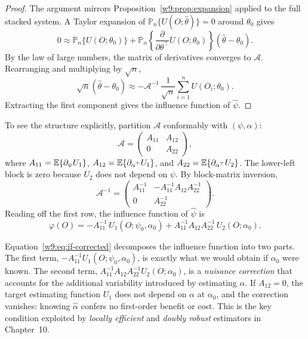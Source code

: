 \documentclass[master.tex]{subfiles}
\begin{document}
\begin{proof}
The argument mirrors Proposition~\ref{w9:prop:expansion} applied to the
full stacked system.  A Taylor expansion of
$\mathbb{P}_n\{U(O;\hat\theta)\}=0$ around $\theta_0$ gives
\[
  0
  \approx
  \mathbb{P}_n\{U(O;\theta_0)\}
  +
  \mathbb{P}_n\!\left\{\frac{\partial}{\partial\theta^\top}
  U(O;\theta_0)\right\}(\hat\theta-\theta_0).
\]
By the law of large numbers, the matrix of derivatives converges to
$\mathcal{A}$.  Rearranging and multiplying by $\sqrt{n}$,
\[
  \sqrt{n}(\hat\theta - \theta_0)
  \approx
  -\mathcal{A}^{-1}\,\frac{1}{\sqrt{n}}\sum_{i=1}^n U(O_i;\theta_0).
\]
Extracting the first component gives the influence function of
$\hat\psi$.
\end{proof}

To see the structure explicitly, partition $\mathcal{A}$ conformably
with $(\psi,\alpha)$:
\[
  \mathcal{A}
  =
  \begin{pmatrix} A_{11} & A_{12} \\ 0 & A_{22} \end{pmatrix},
\]
where $A_{11} = \mathbb{E}\{\partial_\psi U_1\}$,
$A_{12} = \mathbb{E}\{\partial_{\alpha^\top} U_1\}$, and
$A_{22} = \mathbb{E}\{\partial_{\alpha^\top} U_2\}$.
The lower-left block is zero because $U_2$ does not depend on $\psi$.
By block-matrix inversion,
\[
  \mathcal{A}^{-1}
  =
  \begin{pmatrix}
    A_{11}^{-1} & -A_{11}^{-1}A_{12}A_{22}^{-1} \\
    0 & A_{22}^{-1}
  \end{pmatrix}.
\]
Reading off the first row, the influence function of $\hat\psi$ is
\begin{equation}
  \varphi(O)
  =
  -A_{11}^{-1}\,U_1(O;\psi_0,\alpha_0)
  +A_{11}^{-1}A_{12}A_{22}^{-1}\,U_2(O;\alpha_0).
  \label{w9:eq:if-corrected}
\end{equation}

\begin{remark}
\label{w9:rem:correction}
Equation~\eqref{w9:eq:if-corrected} decomposes the influence function
into two parts.  The first term,
$-A_{11}^{-1}U_1(O;\psi_0,\alpha_0)$, is exactly what we would obtain
if $\alpha_0$ were known.  The second term,
$A_{11}^{-1}A_{12}A_{22}^{-1}U_2(O;\alpha_0)$, is a
\emph{nuisance correction} that accounts for the additional variability
introduced by estimating $\alpha$.  If $A_{12}=0$, the target estimating
function $U_1$ does not depend on $\alpha$ at $\alpha_0$, and the
correction vanishes: knowing $\hat\alpha$ confers no first-order
benefit or cost.  This is the key condition exploited by
\emph{locally efficient} and \emph{doubly robust} estimators in
Chapter~10.
\end{remark}
\end{document}
